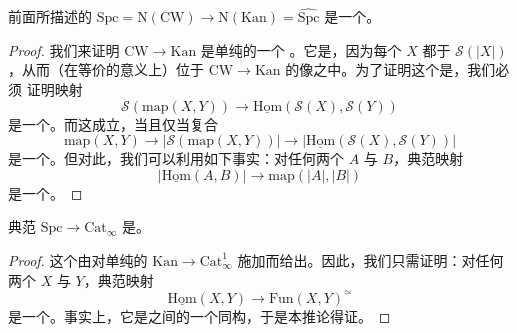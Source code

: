 \begin{corollary}\label{cor:spc-hat-joyal-equivalence}
前面所描述的\trFunctor{}%
$\mathrm{Spc} = \mathrm{N}(\mathrm{CW}) \to \mathrm{N}(\mathrm{Kan}) = \widehat{\mathrm{Spc}}$
是一个\trJoyalEquivalence{}。
\end{corollary}

\begin{proof}
我们来证明\trFunctor{} $\mathrm{CW} \to \mathrm{Kan}$ 是单纯\trCategories{}的一个%
\trWeakEquivalence{}。它是\trWeaklyEssentiallySurjective{}，因为每个\trKanComplex{} $X$
都\trHomotopyEquivalence{}于 $\mathcal{S}(|X|)$，从而（在等价的意义上）位于\trFunctor{}%
$\mathrm{CW} \to \mathrm{Kan}$ 的像之中。为了证明这个\trFunctor{}是\trFullyFaithful{}，我们必须
证明映射
\[
\mathcal{S}(\mathrm{map}(X, Y)) \longrightarrow
\underline{\mathrm{Hom}}(\mathcal{S}(X), \mathcal{S}(Y))
\]
是一个\trHomotopyEquivalence{}。而这成立，当且仅当复合
\[
\mathrm{map}(X, Y) \longrightarrow |\mathcal{S}(\mathrm{map}(X, Y))|
\longrightarrow |\underline{\mathrm{Hom}}(\mathcal{S}(X), \mathcal{S}(Y))|
\]
是一个\trHomotopyEquivalence{}。但对此，我们可以利用如下事实：对任何两个\trKanComplex{} $A$ 与
$B$，典范映射
\[
|\underline{\mathrm{Hom}}(A, B)| \longrightarrow \mathrm{map}(|A|, |B|)
\]
是一个\trHomotopyEquivalence{}。
\end{proof}

\begin{corollary}\label{cor:spc-fully-faithful}
典范\trFunctor{} $\mathrm{Spc} \to \mathrm{Cat}_{\infty}$ 是\trFullyFaithful{}。
\end{corollary}

\begin{proof}
这个\trFunctor{}由对单纯\trCategories{}的\trFunctor{}%
$\mathrm{Kan} \to \mathrm{Cat}^1_{\infty}$ 施加\trCoherentNerve{}而给出。因此，我们只需证明：对任何两个%
\trKanComplex{} $X$ 与 $Y$，典范映射
\[
\underline{\mathrm{Hom}}(X, Y) \longrightarrow \mathrm{Fun}(X, Y)^{\simeq}
\]
是一个\trHomotopyEquivalence{}。事实上，它是\trSimplicialSets{}之间的一个同构，于是本推论得证。
\end{proof}


